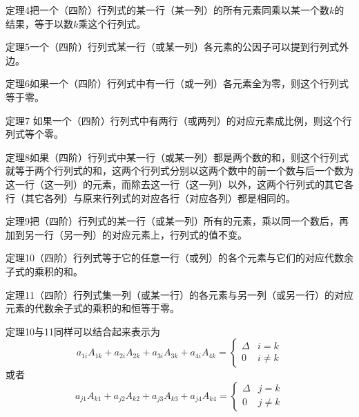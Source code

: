 \begin{blk}
    {定理4}把一个（四阶）行列式的某一行（某一列）的所有元素同乘以某一个数$k$的结果，等于以数$k$乘这个行列式。
\end{blk}

\begin{blk}
    {定理5}一个（四阶）行列式某一行（或某一列）各元素的公因子可以提到行列式外边。
\end{blk}

\begin{blk}
    {定理6}如果一个（四阶）行列式中有一行（或一列）各元素全为零，则这个行列式等于零。
\end{blk}

\begin{blk}
    {定理7} 如果一个（四阶）行列式中有两行（或两列）的对应元素成比例，则这个行列式等个零。
\end{blk}

\begin{blk}
    {定理8}如果（四阶）行列式中某一行（或某一列）都是两个数的和，则这个行列式就等于两个行列式的和，这两个行列式分别以这两个数中的前一个数与后一个数为这一行（这一列）的元素，而除去这一行（这一列）以外，这两个行列式的其它各行（其它各列）与原来行列式的对应各行（对应各列）都是相同的。
\end{blk}

\begin{blk}
    {定理9}把（四阶）行列式的某一行（或某一列）所有的元素，乘以同一个数后，再加到另一行（另一列）的对应元素上，行列式的值不变。
\end{blk}

\begin{blk}
    {定理10}（四阶）行列式等于它的任意一行（或列）的各个元素与它们的对应代数余子式的乘积的和。
\end{blk}

\begin{blk}
    {定理11}（四阶）行列式集一列（或某一行）的各元素与另一列（或另一行）的对应元素的代数余子式的乘积的和恒等于零。
\end{blk}

定理10与11同样可以结合起来表示为
\[a_{1i}A_{1k}+a_{2i}A_{2k}+a_{3i}A_{3k}+a_{4i}A_{4k}=\begin{cases}
    \Delta&i=k \\ 0& i\ne k
\end{cases}\]
或者
\[a_{j1}A_{k1}+a_{j2}A_{k2}+a_{j3}A_{k3}+a_{j4}A_{k4}=\begin{cases}
    \Delta&j=k \\ 0& j\ne k
\end{cases}\]


